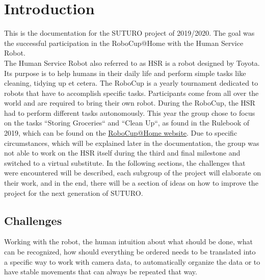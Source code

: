 \documentclass[main.tex]{subfiles}
\begin{document}
	\chapter{Introduction}
	\label{introduction}
	
	This is the documentation for the SUTURO project of 2019/2020. The goal was the successful participation in the RoboCup@Home with the Human Service Robot. \\
	The Human Service Robot also referred to as HSR is a robot designed by Toyota. Its purpose is to help humans in their daily life and perform simple tasks like cleaning, tidying up et cetera. The RoboCup is a yearly tournament dedicated to robots that have to accomplish specific tasks. Participants come from all over the world and are required to bring their own robot.
During the RoboCup, the HSR had to perform different tasks autonomously.
This year the group chose to focus on the tasks “Storing Groceries“ and “Clean Up“, as found in the Rulebook of 2019, which can be found on the \href{http://www.robocupathome.org/rules}{RoboCup@Home website}.
Due to specific circumstances, which will be explained later in the documentation, the group was not able to work on the HSR itself during the third and final milestone and switched to a virtual substitute.
	In the following sections, the challenges that were encountered will be described, each subgroup of the project will elaborate on their work, and in the end, there will be a section of ideas on how to improve the project for the next generation of SUTURO.
	
	\section{Challenges}
	\label{challanges}
	Working with the robot, the human intuition about what should be done, what can be recognized, how should everything be ordered needs to be translated into a specific way to work with camera data, to automatically organize the data or to have stable movements that can always be repeated that way.\\
	
\end{document}
